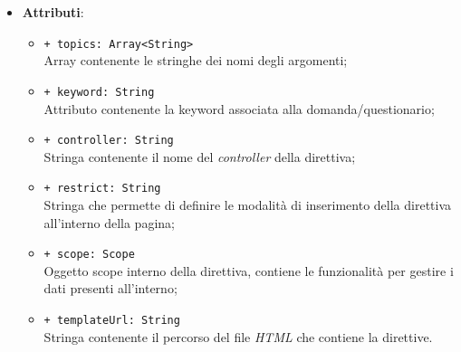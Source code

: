 \begin{itemize}
\begin{itemize}
	\end{itemize}
	\item \textbf{Attributi}:
	\begin{itemize}
		\item \texttt{+ topics: Array<String>} \\ Array contenente le stringhe dei nomi degli argomenti;
		\item \texttt{+ keyword: String} \\ Attributo contenente la keyword associata alla domanda/questionario;
		\item \texttt{+ controller: String} \\ Stringa contenente il nome del \textit{controller} della direttiva;
		\item \texttt{+ restrict: String} \\ Stringa che permette di definire le modalità di inserimento della direttiva all'interno della pagina;
		\item \texttt{+ scope: Scope} \\ Oggetto scope interno della direttiva, contiene le funzionalità per gestire i dati presenti all'interno;
		\item \texttt{+ templateUrl: String} \\ Stringa contenente il percorso del file \textit{HTML} che contiene la direttive.
	\end{itemize}
\end{itemize}
